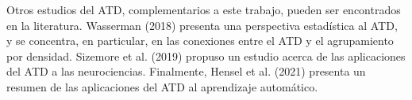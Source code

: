 Otros estudios del ATD, complementarios a este trabajo, pueden ser encontrados en la literatura.
Wasserman (2018) \cite{Wasserman2018} presenta una perspectiva estad\'istica al ATD, y se concentra, en
particular, en las conexiones entre el ATD y el agrupamiento por densidad. Sizemore et al. (2019)
\cite{Sizemore2019} propuso un estudio acerca de las aplicaciones del ATD a las neurociencias.
Finalmente, Hensel et al. (2021) \cite{Hensel2021} presenta un resumen de las aplicaciones
del ATD al aprendizaje autom\'atico.